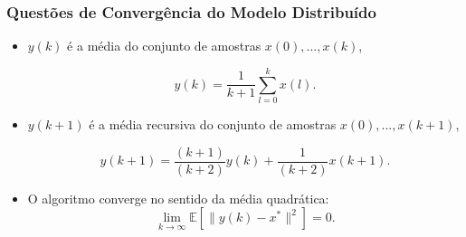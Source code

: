 \documentclass{beamer}
\begin{document}
\begin{frame}
	\frametitle{Questões de Convergência do Modelo Distribuído}

\vspace{-0.5cm}

\begin{itemize}
\item $y(k)$ \'e a m\'edia do conjunto de amostras $x(0),... , x(k)$, 

\begin{equation}
y(k) = \frac{1}{k+1} \sum_{l=0}^{k} x(l).
\end{equation}	

\vspace{0.2cm}

\item $y(k+1)$ é a média recursiva do conjunto de amostras $x(0),... , x(k+1)$,

\begin{equation}
y(k+1) = \frac{(k+1)}{(k+2)}y(k) + \frac{1}{(k+2)}x(k+1).
\end{equation}

\vspace{0.2cm}

\item O algoritmo converge no sentido da m\'edia quadr\'atica: 
%
\begin{equation}
\lim_{k\rightarrow \infty} \mathbb{E} [\parallel y(k)-x^* \parallel^2] = 0.
\end{equation}

\end{itemize}	
	
\end{frame}
\end{document}
